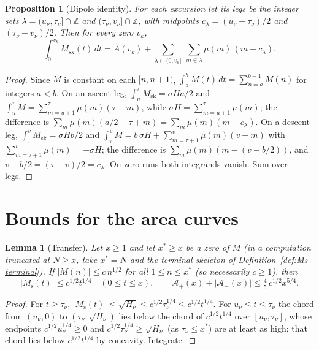 \documentclass[11pt]{amsart}
\numberwithin{equation}{section}
\theoremstyle{plain}
\newtheorem{proposition}[theorem]{Proposition}
\newtheorem{lemma}[theorem]{Lemma}
\theoremstyle{definition}
\theoremstyle{remark}
\newcommand{\Ms}{M_{\mathrm{s}}}
\newcommand{\Msk}{M_{\mathrm{sk}}}
\newcommand{\Ap}{\mathcal{A}_{+}}
\newcommand{\Am}{\mathcal{A}_{-}}
\begin{document}
\begin{proposition}[Dipole identity]
\label{prop:dipoles}
For each excursion let its \emph{legs} be the integer sets
$\lambda=(u_\nu,\tau_\nu]\cap\mathbb{Z}$ and
$(\tau_\nu,v_\nu]\cap\mathbb{Z}$, with midpoints $c_\lambda=(u_\nu+\tau_\nu)/2$
and $(\tau_\nu+v_\nu)/2$. Then for every zero $v_k$,
\begin{equation}
\label{eq:dipoles}
  \int_0^{v_k}\Msk(t)\,dt=\widetilde{A}(v_k)
  +\sum_{\lambda\subset(0,v_k]}\ \sum_{m\in\lambda}\mu(m)\,(m-c_\lambda).
\end{equation}
\end{proposition}

\begin{proof}
Since $M$ is constant on each $[n,n+1)$, $\int_a^bM(t)\,dt=\sum_{n=a}^{b-1}M(n)$
for integers $a<b$. On an ascent leg, $\int_{u}^{\tau}\Msk=\sigma H a/2$ and
$\int_u^\tau M=\sum_{m=u+1}^{\tau}\mu(m)(\tau-m)$, while
$\sigma H=\sum_{m=u+1}^{\tau}\mu(m)$; the difference is
$\sum_m\mu(m)(a/2-\tau+m)=\sum_m\mu(m)(m-c_\lambda)$. On a descent leg,
$\int_\tau^v\Msk=\sigma Hb/2$ and
$\int_\tau^vM=b\,\sigma H+\sum_{m=\tau+1}^{v}\mu(m)(v-m)$ with
$\sum_{m=\tau+1}^{v}\mu(m)=-\sigma H$; the difference is
$\sum_m\mu(m)(m-(v-b/2))$, and $v-b/2=(\tau+v)/2=c_\lambda$. On zero runs
both integrands vanish. Sum over legs.
\end{proof}

\section{Bounds for the area curves}
\label{sec:bounds}

\begin{lemma}[Transfer]
\label{lem:transfer}
Let $x\ge1$ and let $x^*\ge x$ be a zero of $M$ (in a computation truncated
at $N\ge x$, take $x^*=N$ and the terminal skeleton of
Definition~\ref{def:Ms-terminal}). If $|M(n)|\le c\,n^{1/2}$ for all
$1\le n\le x^*$ (so necessarily $c\ge1$), then
\begin{equation}
\label{eq:transfer_bound}
  |\Ms(t)|\le c^{1/2}t^{1/4}\quad(0\le t\le x),\qquad
  \Ap(x)+|\Am(x)|\le\tfrac45\,c^{1/2}x^{5/4}.
\end{equation}
\end{lemma}

\begin{proof}
For $t\ge\tau_\nu$, $|\Ms(t)|\le\sqrt{H_\nu}\le c^{1/2}\tau_\nu^{1/4}\le
c^{1/2}t^{1/4}$. For $u_\nu\le t\le\tau_\nu$ the chord from $(u_\nu,0)$ to
$(\tau_\nu,\sqrt{H_\nu})$ lies below the chord of $c^{1/2}t^{1/4}$ over
$[u_\nu,\tau_\nu]$, whose endpoints $c^{1/2}u_\nu^{1/4}\ge0$ and
$c^{1/2}\tau_\nu^{1/4}\ge\sqrt{H_\nu}$ (as $\tau_\nu\le x^*$) are at
least as high; that chord lies below $c^{1/2}t^{1/4}$ by concavity.
Integrate.
\end{proof}
\end{document}
